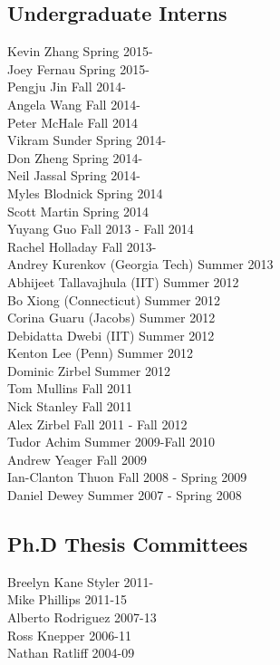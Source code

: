 \subsection{Undergraduate Interns}
\noindent
Kevin Zhang  \hfill Spring 2015-\\
Joey Fernau  \hfill Spring 2015-\\
Pengju Jin  \hfill Fall 2014-\\
Angela Wang  \hfill Fall 2014-\\
Peter McHale  \hfill Fall 2014\\
Vikram Sunder  \hfill Spring 2014-\\
Don Zheng  \hfill Spring 2014-\\
Neil Jassal  \hfill Spring 2014-\\
Myles Blodnick  \hfill Spring 2014\\
Scott Martin  \hfill Spring 2014\\
Yuyang Guo  \hfill Fall 2013 - Fall 2014\\
Rachel Holladay  \hfill Fall 2013-\\
Andrey Kurenkov (Georgia Tech) \hfill Summer 2013\\ 
Abhijeet Tallavajhula (IIT) \hfill Summer 2012\\
Bo Xiong (Connecticut) \hfill Summer 2012\\
Corina Guaru (Jacobs) \hfill Summer 2012\\
Debidatta Dwebi (IIT) \hfill Summer 2012\\
Kenton Lee (Penn) \hfill Summer 2012\\
Dominic Zirbel  \hfill Summer 2012\\
Tom Mullins  \hfill Fall 2011\\
Nick Stanley  \hfill Fall 2011\\
Alex Zirbel  \hfill Fall 2011 - Fall 2012\\
Tudor Achim  \hfill Summer 2009-Fall 2010\\
Andrew Yeager  \hfill Fall 2009\\
Ian-Clanton Thuon  \hfill Fall 2008 - Spring 2009\\
Daniel Dewey  \hfill Summer 2007 - Spring 2008\\

\subsection{Ph.D Thesis Committees}
\noindent
Breelyn Kane Styler  \hfill 2011-\\ 
Mike Phillips  \hfill 2011-15\\
Alberto Rodriguez  \hfill 2007-13\\
Ross Knepper  \hfill 2006-11\\
Nathan Ratliff  \hfill 2004-09\\
